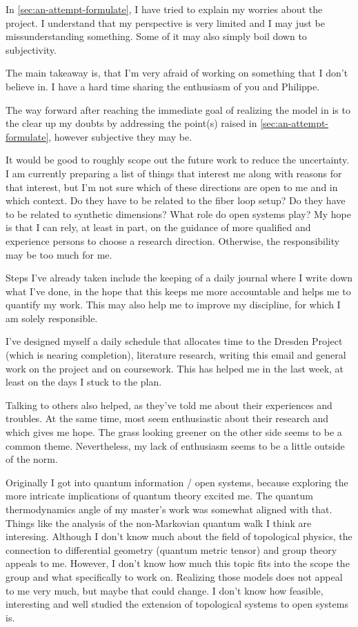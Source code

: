 \documentclass[fontsize=10pt,paper=a4,open=any,
twoside=no,toc=listof,toc=bibliography,headings=optiontohead,
captions=nooneline,captions=tableabove,english,DIV=15,numbers=noenddot,final,parskip=half-,
headinclude=true,footinclude=false,BCOR=0mm]{scrartcl}
\begin{document}
In \cref{sec:an-attempt-formulate}, I have tried to explain my worries
about the project. I understand that my perspective is very limited
and I may just be missunderstanding something. Some of it may also
simply boil down to subjectivity.

The main takeaway is, that I'm very afraid of working on something
that I don't believe in. I have a hard time sharing the enthusiasm of
you and Philippe.

The way forward after reaching the immediate goal of realizing the
model in  is to the clear up my doubts by
addressing the point(s) raised in \cref{sec:an-attempt-formulate},
however subjective they may be.

It would be good to roughly scope out the future work to reduce the
uncertainty. I am currently preparing a list of things that interest
me along with reasons for that interest, but I'm not sure which of
these directions are open to me and in which context. Do they have to
be related to the fiber loop setup? Do they have to be related to
synthetic dimensions?  What role do open systems play? My hope is that
I can rely, at least in part, on the guidance of more qualified and
experience persons to choose a research direction. Otherwise, the
responsibility may be too much for me.

Steps I've already taken include the keeping of a daily journal where
I write down what I've done, in the hope that this keeps me more
accountable and helps me to quantify my work. This may also help me to
improve my discipline, for which I am solely responsible.

I've designed myself a daily schedule that allocates time to the
Dresden Project (which is nearing completion), literature research,
writing this email and general work on the project and on
coursework. This has helped me in the last week, at least on the days
I stuck to the plan.

Talking to others also helped, as they've told me about their
experiences and troubles. At the same time, most seem enthusiastic
about their research and which gives me hope. The grass looking
greener on the other side seems to be a common theme. Nevertheless, my
lack of enthusiasm seems to be a little outside of the norm.

Originally I got into quantum information / open systems, because
exploring the more intricate implications of quantum theory excited
me. The quantum thermodynamics angle of my master's work was somewhat
aligned with that. Things like the analysis of the non-Markovian
quantum walk I think are interesing. Although I don't know much about
the field of topological physics, the connection to differential
geometry (quantum metric tensor) and group theory appeals to
me. However, I don't know how much this topic fits into the scope the
group and what specifically to work on. Realizing those models does
not appeal to me very much, but maybe that could change. I don't know
how feasible, interesting and well studied the extension of
topological systems to open systems is.
\end{document}
